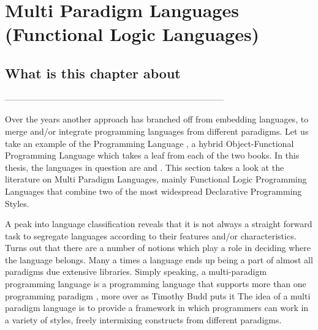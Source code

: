 \documentclass[thesis-solanki.tex]{subfiles}
\begin{document}
\chapter{Multi Paradigm Languages (Functional Logic Languages)}\label{chap:multiparadigm}


\section{What is this chapter about}

-----------------------------------------------------------------------------


Over the years another approach has branched off from embedding languages, to merge and/or integrate programming
languages from different paradigms.
Let us take an example of the  Programming Language \cite{website:scala}, a hybrid
Object-Functional Programming Language which takes a leaf from each of the two books.
In this thesis, the languages in question are  and .
This section takes a look at the literature on Multi Paradigm Languages, mainly Functional Logic Programming
Languages that combine two of the most widespread Declarative Programming Styles.

A peak into language classification reveals that it is not always a straight forward task to segregate languages
according to their features and/or characteristics.
Turns out that there are a number of notions which play a role in deciding where the language belongs.
Many a times a language ends up being a part of almost all paradigms due extensive libraries.
Simply speaking, a multi-paradigm programming language is a programming language that supports more than one
programming paradigm \cite{Krishnamurthi:2008:TPL:1480828.1480846}, more over as Timothy Budd puts it
\cite{website:wikimultiparadigm} The idea of a multi paradigm language is to provide a framework in
which programmers can work in a variety of styles, freely intermixing constructs from different
paradigms.



\begin{comment}
\subparagraph{}
In this section we talk about marrying or integrating the paradigms, multi paradigm programming language approach.
Here we talk about combining the two most important and widely spread declarative paradigms, Functional and Logical
Programming Paradigms.
\end{comment}  
\end{document}
